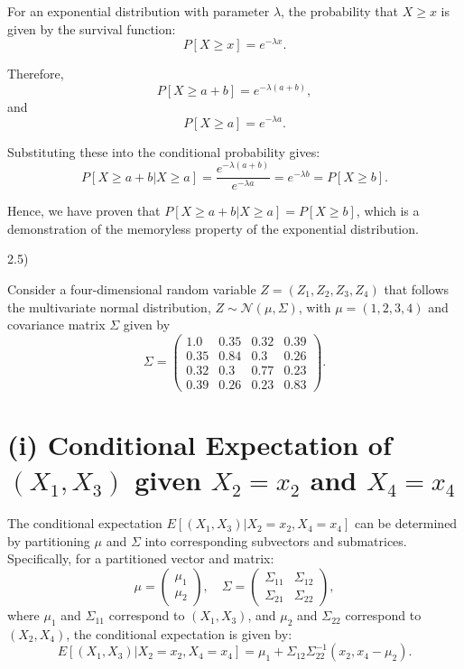 \documentclass{article}
\begin{document}
For an exponential distribution with parameter \(\lambda\), the probability that \(X \geq x\) is given by the survival function:
\[ P[X \geq x] = e^{-\lambda x}. \]

Therefore,
\[ P[X \geq a + b] = e^{-\lambda(a + b)}, \]
and
\[ P[X \geq a] = e^{-\lambda a}. \]

Substituting these into the conditional probability gives:
\[ P[X \geq a + b | X \geq a] = \frac{e^{-\lambda(a + b)}}{e^{-\lambda a}} = e^{-\lambda b} = P[X \geq b]. \]

Hence, we have proven that \(P[X \geq a + b | X \geq a] = P[X \geq b]\), which is a demonstration of the memoryless property of the exponential distribution.


2.5)

Consider a four-dimensional random variable \(Z = (Z_1, Z_2, Z_3, Z_4)\) that follows the multivariate normal distribution, \(Z \sim \mathcal{N}(\mu, \Sigma)\), with \(\mu = (1, 2, 3, 4)\) and covariance matrix \(\Sigma\) given by
\[ \Sigma = \begin{pmatrix}
1.0 & 0.35 & 0.32 & 0.39 \\
0.35 & 0.84 & 0.3 & 0.26 \\
0.32 & 0.3 & 0.77 & 0.23 \\
0.39 & 0.26 & 0.23 & 0.83
\end{pmatrix}. \]

\section*{(i) Conditional Expectation of \((X_1, X_3)\) given \(X_2 = x_2\) and \(X_4 = x_4\)}

The conditional expectation \(E[(X_1, X_3) | X_2 = x_2, X_4 = x_4]\) can be determined by partitioning \(\mu\) and \(\Sigma\) into corresponding subvectors and submatrices. Specifically, for a partitioned vector and matrix:
\[ \mu = \begin{pmatrix} \mu_1 \\ \mu_2 \end{pmatrix}, \quad \Sigma = \begin{pmatrix} \Sigma_{11} & \Sigma_{12} \\ \Sigma_{21} & \Sigma_{22} \end{pmatrix}, \]
where \(\mu_1\) and \(\Sigma_{11}\) correspond to \((X_1, X_3)\), and \(\mu_2\) and \(\Sigma_{22}\) correspond to \((X_2, X_4)\), the conditional expectation is given by:
\[ E[(X_1, X_3) | X_2 = x_2, X_4 = x_4] = \mu_1 + \Sigma_{12} \Sigma_{22}^{-1} (x_2, x_4 - \mu_2). \]
\end{document}
